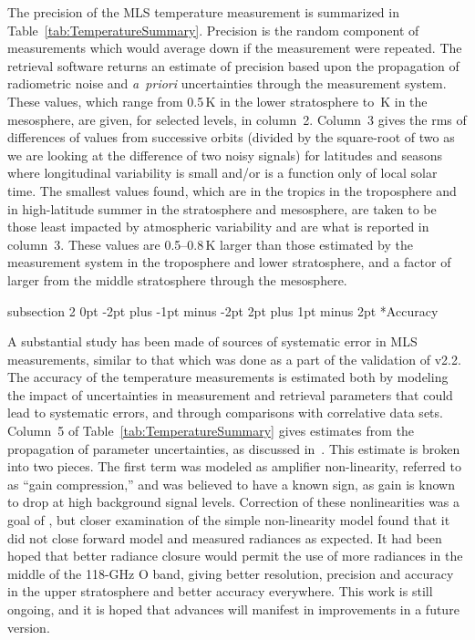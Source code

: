 \documentclass[11pt,draft]{report}
\makeatletter
\renewcommand{\subsection}{\@startsection%
  {subsection}%
  {2}%
  {0pt}%
  {-2pt plus -1pt minus -2pt}%
  {2pt plus 1pt minus 2pt}%
  {\large\sffamily\fontseries{sb}\selectfont\flushleft\color{SectionColor}\figureversion{tabular}}}%
\makeatother
\begin{document}
The precision of the MLS \thisv temperature measurement is summarized in
Table~\ref{tab:TemperatureSummary}.  Precision is the random component
of measurements which would average down if the measurement were
repeated.  The retrieval software returns an estimate of precision based
upon the propagation of radiometric noise and \emph{a~priori}
uncertainties through the measurement system.  These values, which range
from 0.5\,K in the lower stratosphere to \,K in the
mesosphere, are given, for selected levels, in column~2.  Column~3 gives
the rms of differences of values from successive orbits (divided by the
square-root of two as we are looking at the difference of two noisy
signals) for latitudes and seasons where longitudinal variability is
small and/or is a function only of local solar time.  The smallest
values found, which are in the tropics in the troposphere and in 
high-latitude summer in the stratosphere and mesosphere, are taken to be those
least impacted by atmospheric variability and are what is reported in
column~3.  These values are 0.5--0.8\,K larger than those estimated by the
measurement system in the troposphere and lower stratosphere, and a
factor of  larger from the middle stratosphere through
the mesosphere.

\subsection*{Accuracy}

A substantial study has been made of sources of systematic error in MLS
\thisv measurements, similar to that which was done as a part of the
validation of v2.2. The accuracy of the \thisv temperature measurements
is estimated both by modeling the impact of uncertainties in measurement
and retrieval parameters that could lead to systematic errors, and
through comparisons with correlative data sets.  Column~5 of
Table~\ref{tab:TemperatureSummary} gives estimates from the propagation
of parameter uncertainties, as discussed in~\citet{SchwartzEtal08}.
This estimate is broken into two pieces.  The first term was modeled as
amplifier non-linearity, referred to as ``gain compression,'' and was
believed to have a known sign, as gain is known to drop at high
background signal levels. Correction of these nonlinearities was a goal
of \thisv, but closer examination of the simple non-linearity model
found that it did not close forward model and measured radiances as
expected.  It had been hoped that better radiance closure would permit
the use of more radiances in the middle of the 118-GHz O band,
giving better resolution, precision and accuracy in the upper
stratosphere and better accuracy everywhere.  This work is still
ongoing, and it is hoped that advances will manifest in improvements in
a future version.
\end{document}
